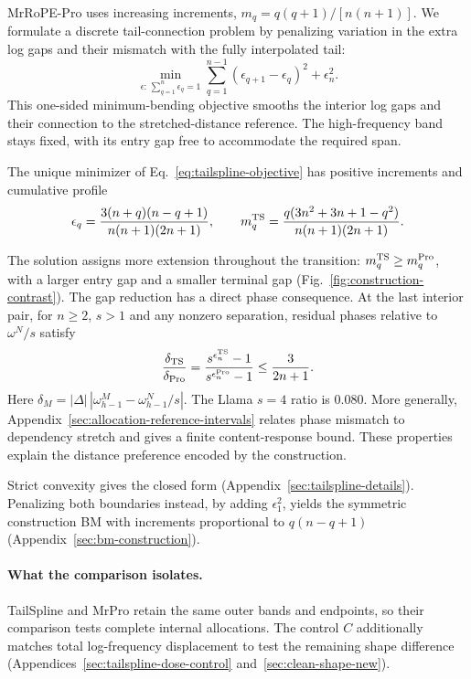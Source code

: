 MrRoPE-Pro uses increasing increments, $m_q=q(q+1)/[n(n+1)]$.
We formulate a discrete tail-connection problem by penalizing variation
in the extra log gaps and their mismatch with the fully interpolated tail:
\begin{equation}
\min_{\epsilon:\,\sum_{q=1}^n\epsilon_q=1}
\sum_{q=1}^{n-1}(\epsilon_{q+1}-\epsilon_q)^2+\epsilon_n^2.
\label{eq:tailspline-objective}
\end{equation}
This one-sided minimum-bending objective smooths the interior log gaps and
their connection to the stretched-distance reference. The high-frequency
band stays fixed, with its entry gap free to accommodate the required span.
\begin{theorem}\label{thm:tailspline}
The unique minimizer of Eq.~\eqref{eq:tailspline-objective} has positive increments and cumulative profile
\begin{equation}
\epsilon_q=\frac{3(n+q)(n-q+1)}{n(n+1)(2n+1)},\qquad
m_q^{\rm TS}=\frac{q(3n^2+3n+1-q^2)}{n(n+1)(2n+1)}.
\label{eq:tailspline}
\end{equation}
\end{theorem}
The solution assigns more extension throughout the transition:
$m_q^{\rm TS}\ge m_q^{\rm Pro}$, with a larger entry gap and a smaller
terminal gap (Fig.~\ref{fig:construction-contrast}). The gap reduction has
a direct phase consequence. At the last interior pair, for $n\ge2$, $s>1$
and any nonzero separation, residual phases relative to $\omega^N/s$ satisfy
\begin{equation}
\frac{\delta_{\rm TS}}{\delta_{\rm Pro}}
=\frac{s^{\epsilon_n^{\rm TS}}-1}{s^{\epsilon_n^{\rm Pro}}-1}
\le\frac{3}{2n+1}.
\label{eq:tail-phase-ratio}
\end{equation}
Here $\delta_M=|\Delta|\,|\omega_{h-1}^{M}-\omega_{h-1}^N/s|$.
The Llama $s=4$ ratio is $0.080$. More generally, Appendix~\ref{sec:allocation-reference-intervals}
relates phase mismatch to dependency stretch and gives a finite content-response
bound. These properties explain the distance preference encoded by the construction.

Strict convexity gives the closed form (Appendix~\ref{sec:tailspline-details}).
Penalizing both boundaries instead,
by adding $\epsilon_1^2$, yields the symmetric construction BM with increments
proportional to $q(n-q+1)$ (Appendix~\ref{sec:bm-construction}).

\paragraph{What the comparison isolates.}
TailSpline and MrPro retain the same outer bands and endpoints, so their
comparison tests complete internal allocations. The control $C$ additionally
matches total log-frequency displacement to test the remaining shape difference
(Appendices~\ref{sec:tailspline-dose-control} and~\ref{sec:clean-shape-new}).

